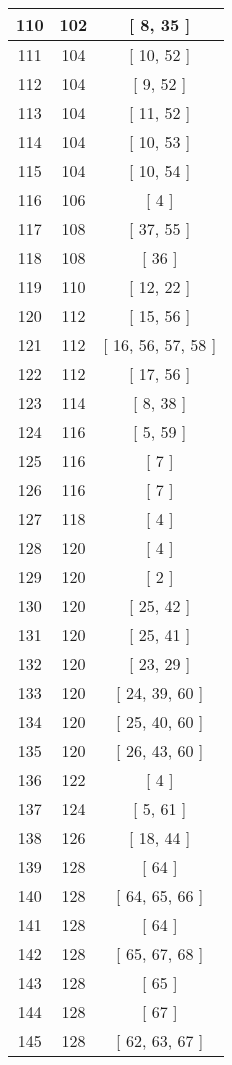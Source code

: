 \begin{center}
\begin{longtable}[H]{|| c c c ||}
\hline
110 & 102 & [ 8, 35 ] \\ 
\hline
111 & 104 & [ 10, 52 ] \\ 
\hline
112 & 104 & [ 9, 52 ] \\ 
\hline
113 & 104 & [ 11, 52 ] \\ 
\hline
114 & 104 & [ 10, 53 ] \\ 
\hline
115 & 104 & [ 10, 54 ] \\ 
\hline
116 & 106 & [ 4 ] \\ 
\hline
117 & 108 & [ 37, 55 ] \\ 
\hline
118 & 108 & [ 36 ] \\ 
\hline
119 & 110 & [ 12, 22 ] \\ 
\hline
120 & 112 & [ 15, 56 ] \\ 
\hline
121 & 112 & [ 16, 56, 57, 58 ] \\ 
\hline
122 & 112 & [ 17, 56 ] \\ 
\hline
123 & 114 & [ 8, 38 ] \\ 
\hline
124 & 116 & [ 5, 59 ] \\ 
\hline
125 & 116 & [ 7 ] \\ 
\hline
126 & 116 & [ 7 ] \\ 
\hline
127 & 118 & [ 4 ] \\ 
\hline
128 & 120 & [ 4 ] \\ 
\hline
129 & 120 & [ 2 ] \\ 
\hline
130 & 120 & [ 25, 42 ] \\ 
\hline
131 & 120 & [ 25, 41 ] \\ 
\hline
132 & 120 & [ 23, 29 ] \\ 
\hline
133 & 120 & [ 24, 39, 60 ] \\ 
\hline
134 & 120 & [ 25, 40, 60 ] \\ 
\hline
135 & 120 & [ 26, 43, 60 ] \\ 
\hline
136 & 122 & [ 4 ] \\ 
\hline
137 & 124 & [ 5, 61 ] \\ 
\hline
138 & 126 & [ 18, 44 ] \\ 
\hline
139 & 128 & [ 64 ] \\ 
\hline
140 & 128 & [ 64, 65, 66 ] \\ 
\hline
141 & 128 & [ 64 ] \\ 
\hline
142 & 128 & [ 65, 67, 68 ] \\ 
\hline
143 & 128 & [ 65 ] \\ 
\hline
144 & 128 & [ 67 ] \\ 
\hline
145 & 128 & [ 62, 63, 67 ] \\ 

\end{longtable}
\end{center}
